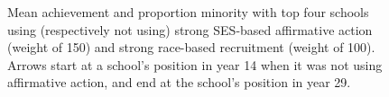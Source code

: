 \begin{figure}[p]
  \centering
  \hfill%
  \caption{Mean achievement and proportion minority with top four schools using (respectively not using) strong SES-based affirmative action (weight of 150) and strong race-based recruitment (weight of 100).
  Arrows start at a school's position in year 14 when it was not using affirmative action, and end at the school's position in year 29.}
  \label{fig:3a}
\end{figure}

